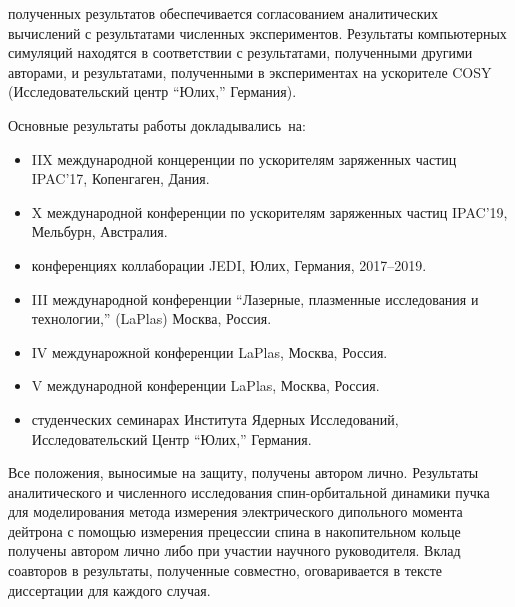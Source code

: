{\reliability} полученных результатов обеспечивается согласованием аналитических вычислений с результатами численных экспериментов. Результаты компьютерных симуляций находятся в соответствии с результатами, полученными другими авторами, и результатами, полученными в экспериментах на ускорителе COSY (Исследовательский центр ``Юлих,'' Германия).


{\probation}
Основные результаты работы докладывались~на:
\begin{itemize}
\item IIX международной концеренции по ускорителям заряженных частиц IPAC'17, Копенгаген, Дания.
\item X международной конференции по ускорителям заряженных частиц IPAC'19, Мельбурн, Австралия.
\item конференциях коллаборации JEDI, Юлих, Германия, 2017--2019.
\item III международной конференции ``Лазерные, плазменные исследования и технологии,'' (LaPlas) Москва, Россия. 
\item IV междунарожной конференции LaPlas, Москва, Россия.
\item V международной конференции LaPlas, Москва, Россия.
\item студенческих семинарах Института Ядерных Исследований, Исследовательский Центр ``Юлих,'' Германия.
\end{itemize}

{\contribution} Все положения, выносимые на защиту, получены автором лично. Результаты аналитического и численного исследования спин-орбитальной динамики пучка для моделирования метода измерения электрического дипольного момента дейтрона с помощью измерения прецессии спина в накопительном кольце получены автором лично либо при участии научного руководителя. Вклад соавторов в результаты, полученные совместно, оговаривается в тексте диссертации для каждого случая.


